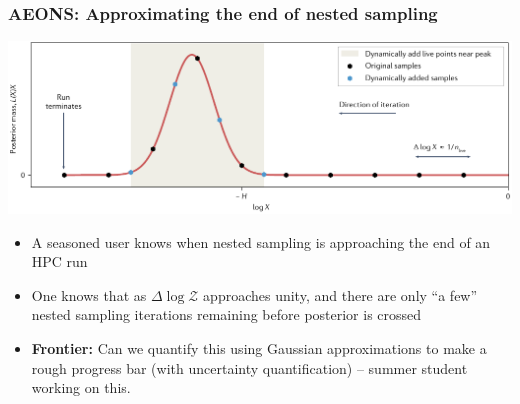 \documentclass[aspectratio=169,handout]{beamer}
\begin{document}
\begin{frame}
    \frametitle{AEONS: Approximating the end of nested sampling}
    \includegraphics[width=\textwidth]{figures/run_prodecure}
    \vspace{-20pt}
    \begin{itemize}
        \item A seasoned user knows when nested sampling is approaching the end of an HPC run
        \item One knows that as $\Delta\log \mathcal{Z}$ approaches unity, and there are only ``a few'' nested sampling iterations remaining before posterior is crossed
        \item \textbf{Frontier:} Can we quantify this using Gaussian approximations to make a rough progress bar (with uncertainty quantification) -- summer student working on this.
    \end{itemize}
\end{frame}
\end{document}
